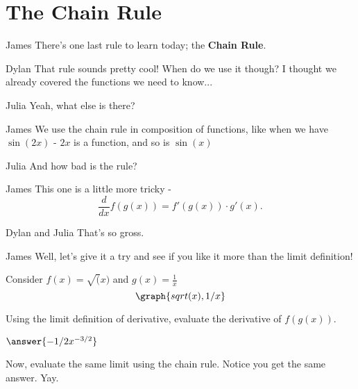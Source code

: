 \documentclass{ximera}
\begin{document}
\section{The Chain Rule}
\begin{dialogue}
\item[James] There's one last rule to learn today; the \textbf{Chain Rule}.
\item[Dylan] That rule sounds pretty cool! When do we use it though? I thought we already covered the functions we need to know...
\item[Julia] Yeah, what else is there?
\item[James] We use the chain rule in composition of functions, like when we have $\sin(2x)$ - $2x$ is a function, and so is $\sin(x)$
\item[Julia] And how bad is the rule?
\item[James] This one is a little more tricky - $$\frac{d}{dx}f(g(x)) = f'(g(x))\cdot g'(x)\text{.}$$
\item[Dylan and Julia] That's so gross.
\item[James] Well, let's give it a try and see if you like it more than the limit definition!
\end{dialogue}
\begin{question}
Consider $f(x) = \sqrt(x)$ and $g(x) = \frac{1}{x}$
\[
\graph{sqrt(x), 1/x}
\]

Using the limit definition of derivative, evaluate the derivative of $f(g(x))$.

$\answer{-1/2x^{-3/2}}$

Now, evaluate the same limit using the chain rule. Notice you get the same answer. Yay.

\end{question}
\end{document}
